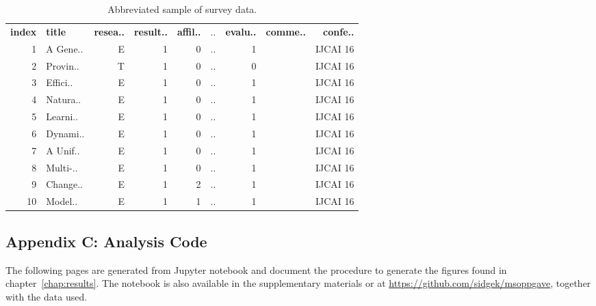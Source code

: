 \begin{table}[!h]
\begin{center}
    \begin{tabular}{ rlrrrrrrr }
    \textbf{index} & \textbf{title} & \textbf{resea..} & \textbf{result..} & \textbf{affil..} & .. & \textbf{evalu..} & \textbf{comme..} & \textbf{confe..} \\
    1 & A Gene.. & E & 1 & 0 & ..	& 1 & & IJCAI 16 \\
    2 & Provin.. & T &	1 &	0 & .. & 0 & & IJCAI 16 \\
    3 &	Effici.. &	E &	1 &	0 & .. & 1 & & IJCAI 16 \\
    4 &	Natura.. & E &	1 &	0 &	.. & 1 & & IJCAI 16 \\
    5 &	Learni.. & E &	1 &	0 & .. & 1 & & IJCAI 16 \\
    6 &	Dynami.. & E &	1 &	0 & .. & 1 & & IJCAI 16 \\
    7 &	A Unif.. & E &	1 &	0 &	.. & 1 & & IJCAI 16 \\
    8 &	Multi-.. & E &	1 &	0 & .. & 1 & & IJCAI 16 \\
    9 &	Change.. & E &	1 &	2 & .. & 1 & & IJCAI 16 \\
    10 & Model.. & E & 1 & 1 & .. & 1 & & IJCAI 16 \\
    \end{tabular}
\end{center}
\caption{Abbreviated sample of survey data.}
\label{tab:sample_survey_data}
\end{table}

\subsection*{Appendix C: Analysis Code}
\label{app:analysis_code}
The following pages are generated from Jupyter notebook and document the procedure to generate the figures found in chapter~\ref{chap:results}. The notebook is also available in the supplementary materials or at \url{https://github.com/sidgek/msoppgave}, together with the data used.

